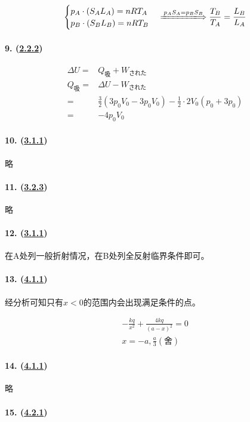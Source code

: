 \begin{equation*}
    \begin{cases}
        p_A\cdot(S_AL_A)=nRT_A\\
        p_B\cdot(S_BL_B)=nRT_B
    \end{cases}\xLongrightarrow{p_AS_A=p_BS_B}
    \frac{T_B}{T_A}=\frac{L_B}{L_A}
\end{equation*}

\paragraph{9. (\hyperref[subsec:2.2.2]{2.2.2})}

\begin{align*}
    \Delta U=&Q_\textrm{吸}+W_\textrm{された}\\
    Q_\textrm{吸}=&\Delta U-W_\textrm{された}\\
    =&\frac32(3p_0V_0-3p_0V_0)-\frac12\cdot2V_0(p_0+3p_0)\\
    =&-4p_0V_0
\end{align*}

\paragraph{10. (\hyperref[subsec:3.1.1]{3.1.1})} 略
\paragraph{11. (\hyperref[subsec:3.2.3]{3.2.3})} 略
\paragraph{12. (\hyperref[subsec:3.1.1]{3.1.1})} 在A处列一般折射情况，在B处列全反射临界条件即可。
\paragraph{13. (\hyperref[subsec:4.1.1]{4.1.1})} 经分析可知只有$x<0$的范围内会出现满足条件的点。

\begin{gather*}
    -\frac{kq}{x^2}+\frac{4kq}{(a-x)^2}=0\\
    x=-a,\frac{a}{3}(\textrm{舍})
\end{gather*}

\paragraph{14. (\hyperref[subsec:4.1.1]{4.1.1})} 略
\paragraph{15. (\hyperref[subsec:4.2.1]{4.2.1})}

